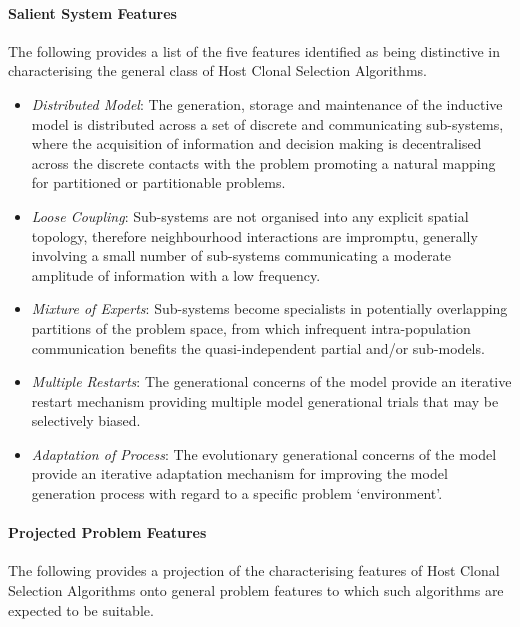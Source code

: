 %
%
\paragraph{Salient System Features}
The following provides a list of the five features identified as being distinctive in characterising the general class of Host Clonal Selection Algorithms. 

\begin{itemize}
	\item \emph{Distributed Model}: The generation, storage and maintenance of the inductive model is distributed across a set of discrete and communicating sub-systems, where the acquisition of information and decision making is decentralised across the discrete contacts with the problem promoting a natural mapping for partitioned or partitionable problems.	
	\item \emph{Loose Coupling}: Sub-systems are not organised into any explicit spatial topology, therefore neighbourhood interactions are impromptu, generally involving a small number of sub-systems communicating a moderate amplitude of information with a low frequency.	
	\item \emph{Mixture of Experts}: Sub-systems become specialists in potentially overlapping partitions of the problem space, from which infrequent intra-population communication benefits the quasi-independent partial and/or sub-models.	
	\item \emph{Multiple Restarts}: The generational concerns of the model provide an iterative restart mechanism providing multiple model generational trials that may be selectively biased.
	\item \emph{Adaptation of Process}: The evolutionary generational concerns of the model provide an iterative adaptation mechanism for improving the model generation process with regard to a specific problem `environment'.	
\end{itemize}

%
%
\paragraph{Projected Problem Features}
The following provides a projection of the characterising features of Host Clonal Selection Algorithms onto general problem features to which such algorithms are expected to be suitable.

